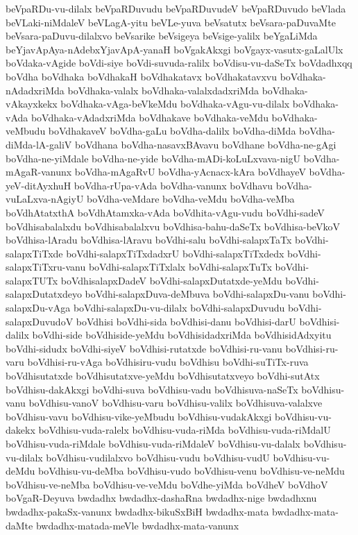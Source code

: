 {beVpaRDu-vu-dilalx
beVpaRDuvudu
beVpaRDuvudeV
beVpaRDuvudo
beVlada
beVLaki-niMdaleV
beVLagA-yitu
beVLe-yuva
beVsatutx
beVsara-paDuvaMte
beVsara-paDuvu-dilalxvo
beVsarike
beVsigeya
beVsige-yalilx
beYgaLiMda
beYjavApAya-nAdebxYjavApA-yanaH
boVgakAkxgi
boVgayx-vasutx-gaLalUlx
boVdaka-vAgide
boVdi-siye
boVdi-suvuda-ralilx
boVdisu-vu-daSeTx
boVdadhxqq
boVdha
boVdhaka
boVdhakaH
boVdhakatavx
boVdhakatavxvu
boVdhaka-nAdadxriMda
boVdhaka-valalx
boVdhaka-valalxdadxriMda
boVdhaka-vAkayxkekx
boVdhaka-vAga-beVkeMdu
boVdhaka-vAgu-vu-dilalx
boVdhaka-vAda
boVdhaka-vAdadxriMda
boVdhakave
boVdhaka-veMdu
boVdhaka-veMbudu
boVdhakaveV
boVdha-gaLu
boVdha-dalilx
boVdha-diMda
boVdha-diMda-lA-galiV
boVdhana
boVdha-nasavxBAvavu
boVdhane
boVdha-ne-gAgi
boVdha-ne-yiMdale
boVdha-ne-yide
boVdha-mADi-koLuLxvava-nigU
boVdha-mAgaR-vanunx
boVdha-mAgaRvU
boVdha-yAcnacx-kAra
boVdhayeV
boVdha-yeV-ditAyxhuH
boVdha-rUpa-vAda
boVdha-vanunx
boVdhavu
boVdha-vuLaLxva-nAgiyU
boVdha-veMdare
boVdha-veMdu
boVdha-veMba
boVdhAtatxthA
boVdhAtamxka-vAda
boVdhita-vAgu-vudu
boVdhi-sadeV
boVdhisabalalxdu
boVdhisabalalxvu
boVdhisa-bahu-daSeTx
boVdhisa-beVkoV
boVdhisa-lAradu
boVdhisa-lAravu
boVdhi-salu
boVdhi-salapxTaTx
boVdhi-salapxTiTxde
boVdhi-salapxTiTxdadxrU
boVdhi-salapxTiTxdedx
boVdhi-salapxTiTxru-vanu
boVdhi-salapxTiTxlalx
boVdhi-salapxTuTx
boVdhi-salapxTUTx
boVdhisalapxDadeV
boVdhi-salapxDutatxde-yeMdu
boVdhi-salapxDutatxdeyo
boVdhi-salapxDuva-deMbuva
boVdhi-salapxDu-vanu
boVdhi-salapxDu-vAga
boVdhi-salapxDu-vu-dilalx
boVdhi-salapxDuvudu
boVdhi-salapxDuvudoV
boVdhisi
boVdhi-sida
boVdhisi-danu
boVdhisi-darU
boVdhisi-dalilx
boVdhi-side
boVdhiside-yeMdu
boVdhisidadxriMda
boVdhisidAdxyitu
boVdhi-sidudx
boVdhi-siyeV
boVdhisi-rutatxde
boVdhisi-ru-vanu
boVdhisi-ru-varu
boVdhisi-ru-vAga
boVdhisiru-vudu
boVdhisu
boVdhi-suTiTx-ruva
boVdhisutatxde
boVdhisutatxve-yeMdu
boVdhisutatxveyo
boVdhi-sutAtx
boVdhisu-dakAkxgi
boVdhi-suva
boVdhisu-vadu
boVdhisuva-naSeTx
boVdhisu-vanu
boVdhisu-vanoV
boVdhisu-varu
boVdhisu-valilx
boVdhisuva-valalxve
boVdhisu-vavu
boVdhisu-vike-yeMbudu
boVdhisu-vudakAkxgi
boVdhisu-vu-dakekx
boVdhisu-vuda-ralelx
boVdhisu-vuda-riMda
boVdhisu-vuda-riMdalU
boVdhisu-vuda-riMdale
boVdhisu-vuda-riMdaleV
boVdhisu-vu-dalalx
boVdhisu-vu-dilalx
boVdhisu-vudilalxvo
boVdhisu-vudu
boVdhisu-vudU
boVdhisu-vu-deMdu
boVdhisu-vu-deMba
boVdhisu-vudo
boVdhisu-venu
boVdhisu-ve-neMdu
boVdhisu-ve-neMba
boVdhisu-ve-veMdu
boVdhe-yiMda
boVdheV
boVdhoV
boVgaR-Deyuva
bwdadhx
bwdadhx-dashaRna
bwdadhx-nige
bwdadhxnu
bwdadhx-pakaSx-vanunx
bwdadhx-bikuSxBiH
bwdadhx-mata
bwdadhx-mata-daMte
bwdadhx-matada-meVle
bwdadhx-mata-vanunx
}
